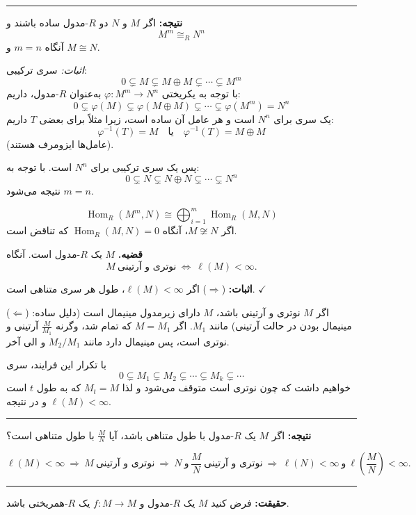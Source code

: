 \noindent\rule{\linewidth}{0.4pt}

\textbf{نتیجه:}
اگر $M$ و $N$ دو $R$-مدول ساده باشند و
\[
    M^m \cong_R N^n
\]
آنگاه $m = n$ و $M \cong N$.

\textit{اثبات:}
سری ترکیبی:
\[
    0 \subsetneq M \subsetneq M \oplus M \subsetneq \cdots \subsetneq M^m
\]
با توجه به یکریختی $\varphi : M^m \to N^n$ به‌عنوان $R$-مدول، داریم:
\[
    0 \subsetneq \varphi(M) \subsetneq \varphi(M \oplus M) \subsetneq \cdots \subsetneq \varphi(M^m) = N^n
\]
یک سری برای $N^n$ است و هر عامل آن ساده است، زیرا مثلاً برای بعضی $T$ داریم:
\[
    \varphi^{-1}(T) = M \quad \text{یا} \quad \varphi^{-1}(T) = M \oplus M
\]
(عامل‌ها ایزومرف هستند).

پس یک سری ترکیبی برای $N^n$ است. با توجه به:
\[
    0 \subsetneq N \subsetneq N \oplus N \subsetneq \cdots \subsetneq N^n
\]
نتیجه می‌شود $m = n$.

\[
    \operatorname{Hom}_R(M^m, N) \cong \bigoplus_{i=1}^m \operatorname{Hom}_R(M, N)
\]
اگر $M \not\cong N$، آنگاه $\operatorname{Hom}_R(M, N) = 0$ که تناقض است.

\textbf{قضیه.}
$M$ یک $R$-مدول است. آنگاه
\[
    M \ \text{نوتری و آرتینی} \ \Longleftrightarrow \ \ell(M) < \infty.
\]

\textbf{اثبات:}
($\Rightarrow$) اگر $\ell(M) < \infty$، طول هر سری متناهی است. $\checkmark$

($\Leftarrow$) اگر $M$ نوتری و آرتینی باشد، $M$ دارای زیرمدول مینیمال است (دلیل ساده: مینیمال بودن در حالت آرتینی) مانند $M_1$.
اگر $M = M_1$ که تمام شد، وگرنه $\frac{M}{M_1}$ آرتینی و نوتری است، پس مینیمال دارد مانند $M_2 / M_1$ و الی آخر.

با تکرار این فرایند، سری
\[
    0 \subsetneq M_1 \subsetneq M_2 \subsetneq \cdots \subsetneq M_k \subsetneq \cdots
\]
خواهیم داشت که چون نوتری است متوقف می‌شود و لذا $M_t = M$ که به طول $t$ است و در نتیجه $\ell(M) < \infty$.

\noindent\rule{\linewidth}{0.4pt}

\textbf{نتیجه:}
اگر $M$ یک $R$-مدول با طول متناهی باشد، آیا $\frac{M}{N}$ با طول متناهی است؟

\[
    \ell(M) < \infty \ \Rightarrow \ M \ \text{نوتری و آرتینی} \ \Rightarrow \ N \ \text{و} \ \frac{M}{N} \ \text{نوتری و آرتینی} \ \Rightarrow \ \ell(N) < \infty \ \text{و} \ \ell\left(\frac{M}{N}\right) < \infty.
\]

\noindent\rule{\linewidth}{0.4pt}

\textbf{حقیقت:}
فرض کنید $M$ یک $R$-مدول و $f : M \to M$ یک $R$-همریختی باشد.

